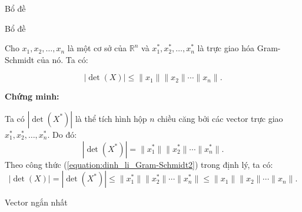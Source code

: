 \begin{frame}{Bổ đề}

\begin{block}{Bổ đề}\label{BD1}

Cho $x_1, x_2, \ldots, x_n$ là một cơ sở của $\mathbb{R}^n$
và $x_1^*, x_2^*, \ldots, x_n^*$ là trực giao hóa Gram-Schmidt của nó.
Ta có:

\[
|\det(X)| \leq \|x_1\|\|x_2\|\cdots\|x_n\|.
\]

\end{block}

\textbf{Chứng minh:}

Ta có $|\det(X^*)|$ là thể tích hình hộp $n$ chiều căng bởi các vector trực giao $x_1^*, x_2^*, \ldots, x_n^*$. Do đó:
\[
|\det(X^*)| = \|x_1^*\|\|x_2^*\|\cdots\|x_n^*\|.
\]
Theo công thức (\ref{equation:dinh_li_Gram-Schmidt2}) trong định lý, ta có:
\[
|\det(X)| = |\det(X^*)| \leq \|x_1^*\|\|x_2^*\|\cdots\|x_n^*\| \leq \|x_1\|\|x_2\|\cdots\|x_n\|.
\]

\end{frame}
\begin{frame}{Vector ngắn nhất}





\end{frame}
